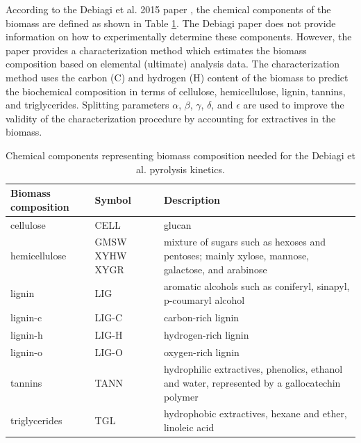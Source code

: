 According to the Debiagi et al. 2015 paper \cite{Debiagi-2015}, the chemical components of the biomass are defined as shown in Table \ref{tab:chem-components}. The Debiagi paper does not provide information on how to experimentally determine these components. However, the paper provides a characterization method which estimates the biomass composition based on elemental (ultimate) analysis data. The characterization method uses the carbon (C) and hydrogen (H) content of the biomass to predict the biochemical composition in terms of cellulose, hemicellulose, lignin, tannins, and triglycerides. Splitting parameters $\alpha$, $\beta$, $\gamma$, $\delta$, and $\epsilon$ are used to improve the validity of the characterization procedure by accounting for extractives in the biomass.

\begin{table}[H]
    \centering
    \caption{Chemical components representing biomass composition needed for the Debiagi et al. pyrolysis kinetics.}
    \label{tab:chem-components}
    \begin{tabular}{lp{2cm}p{7cm}}
        \toprule
        Biomass composition & Symbol & Description \\
        \midrule
        cellulose     & CELL & glucan \\
        \addlinespace[0.2in]
        hemicellulose & GMSW XYHW XYGR & mixture of sugars such as hexoses and pentoses; mainly xylose, mannose, galactose, and arabinose \\
        \addlinespace[0.2in]
        lignin        & LIG & aromatic alcohols such as coniferyl, sinapyl, p-coumaryl alcohol\\
        \addlinespace[0.2in]
        lignin-c      & LIG-C & carbon-rich lignin \\
        \addlinespace[0.2in]
        lignin-h      & LIG-H & hydrogen-rich lignin \\
        \addlinespace[0.2in]
        lignin-o      & LIG-O & oxygen-rich lignin \\
        \addlinespace[0.2in]
        tannins       & TANN & hydrophilic extractives, phenolics, ethanol and water, represented by a gallocatechin polymer \\
        \addlinespace[0.2in]
        triglycerides & TGL & hydrophobic extractives, hexane and ether, linoleic acid \\
        \bottomrule
    \end{tabular}
\end{table}

